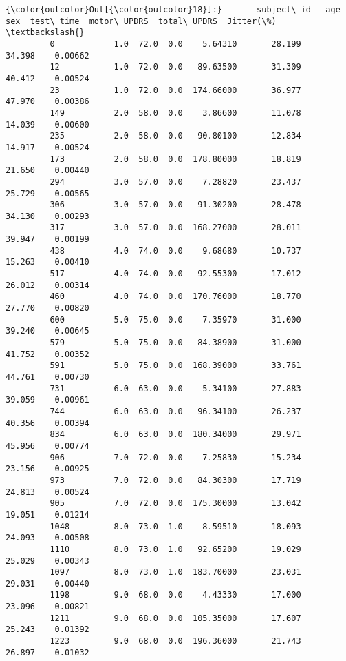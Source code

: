 \documentclass[11pt]{article}
\begin{document}
\begin{Verbatim}[commandchars=\\\{\}]
{\color{outcolor}Out[{\color{outcolor}18}]:}       subject\_id   age  sex  test\_time  motor\_UPDRS  total\_UPDRS  Jitter(\%)  \textbackslash{}
         0            1.0  72.0  0.0    5.64310       28.199       34.398    0.00662   
         12           1.0  72.0  0.0   89.63500       31.309       40.412    0.00524   
         23           1.0  72.0  0.0  174.66000       36.977       47.970    0.00386   
         149          2.0  58.0  0.0    3.86600       11.078       14.039    0.00600   
         235          2.0  58.0  0.0   90.80100       12.834       14.917    0.00524   
         173          2.0  58.0  0.0  178.80000       18.819       21.650    0.00440   
         294          3.0  57.0  0.0    7.28820       23.437       25.729    0.00565   
         306          3.0  57.0  0.0   91.30200       28.478       34.130    0.00293   
         317          3.0  57.0  0.0  168.27000       28.011       39.947    0.00199   
         438          4.0  74.0  0.0    9.68680       10.737       15.263    0.00410   
         517          4.0  74.0  0.0   92.55300       17.012       26.012    0.00314   
         460          4.0  74.0  0.0  170.76000       18.770       27.770    0.00820   
         600          5.0  75.0  0.0    7.35970       31.000       39.240    0.00645   
         579          5.0  75.0  0.0   84.38900       31.000       41.752    0.00352   
         591          5.0  75.0  0.0  168.39000       33.761       44.761    0.00730   
         731          6.0  63.0  0.0    5.34100       27.883       39.059    0.00961   
         744          6.0  63.0  0.0   96.34100       26.237       40.356    0.00394   
         834          6.0  63.0  0.0  180.34000       29.971       45.956    0.00774   
         906          7.0  72.0  0.0    7.25830       15.234       23.156    0.00925   
         973          7.0  72.0  0.0   84.30300       17.719       24.813    0.00524   
         905          7.0  72.0  0.0  175.30000       13.042       19.051    0.01214   
         1048         8.0  73.0  1.0    8.59510       18.093       24.093    0.00508   
         1110         8.0  73.0  1.0   92.65200       19.029       25.029    0.00343   
         1097         8.0  73.0  1.0  183.70000       23.031       29.031    0.00440   
         1198         9.0  68.0  0.0    4.43330       17.000       23.096    0.00821   
         1211         9.0  68.0  0.0  105.35000       17.607       25.243    0.01392   
         1223         9.0  68.0  0.0  196.36000       21.743       26.897    0.01032   

\end{Verbatim}
\end{document}

